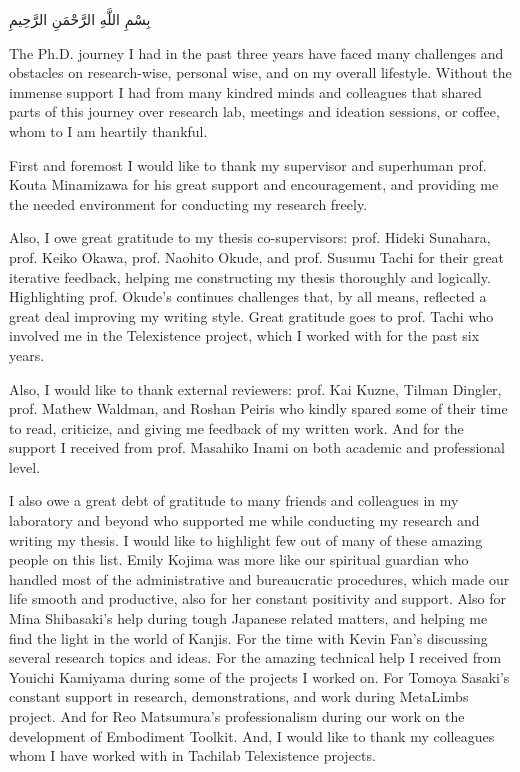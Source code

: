 
\acknowledgements
{}
\begin{arabtext}
\centerline{بِسْمِ اللَّهِ الرَّحْمَنِ الرَّحِيمِ }  
\end{arabtext}
 \hfill \break
 
The Ph.D. journey I had in the past three years have faced many challenges and obstacles on research-wise, personal wise, and on my overall lifestyle. Without the immense support I had from many kindred minds and colleagues that shared parts of this journey over research lab, meetings and ideation sessions, or coffee, whom to I am heartily thankful. 

First and foremost I would like to thank my supervisor and superhuman prof. Kouta Minamizawa for his great support and encouragement, and providing me the needed environment for conducting my research freely.

Also, I owe great gratitude to my thesis co-supervisors: prof. Hideki Sunahara, prof. Keiko Okawa, prof. Naohito Okude, and prof. Susumu Tachi for their great iterative feedback, helping me constructing my thesis thoroughly and logically. Highlighting prof. Okude's continues challenges that, by all means, reflected a great deal improving my writing style. Great gratitude goes to prof. Tachi who involved me in the Telexistence project, which I worked with for the past six years. 

Also, I would like to thank external reviewers: prof. Kai Kuzne, Tilman Dingler, prof. Mathew Waldman, and Roshan Peiris who kindly spared some of their time to read, criticize, and giving me feedback of my written work. And for the support I received from prof. Masahiko Inami on both academic and professional level.

I also owe a great debt of gratitude to many friends and colleagues in my laboratory and beyond who supported me while conducting my research and writing my thesis. I would like to highlight few out of many of these amazing people on this list. Emily Kojima was more like our spiritual guardian who handled most of the administrative and bureaucratic procedures, which made our life smooth and productive, also for her constant positivity and support. Also for Mina Shibasaki's help during tough Japanese related matters, and helping me find the light in the world of Kanjis. For the time with Kevin Fan's discussing several research topics and ideas. For the amazing technical help I received from Youichi Kamiyama during some of the projects I worked on. For Tomoya Sasaki's constant support in research, demonstrations, and work during MetaLimbs project. And for Reo Matsumura's professionalism during our work on the development of Embodiment Toolkit. And, I would like to thank my colleagues whom I have worked with in Tachilab Telexistence projects. 

